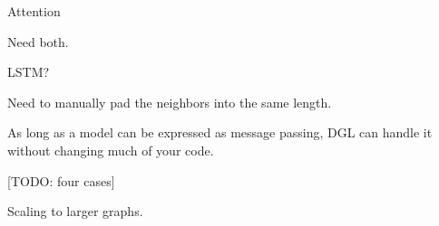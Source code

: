 \documentclass[11pt,aspectratio=169]{beamer}
\begin{document}
	\begin{frame}
		Attention
		
		Need both.
	\end{frame}

	\begin{frame}
		LSTM?
		
		Need to manually pad the neighbors into the same length.
	\end{frame}

	\begin{frame}
		As long as a model can be expressed as message passing, DGL can handle it
		without changing much of your code.
		
		[TODO: four cases]
	\end{frame}

	\begin{frame}
		Scaling to larger graphs.
	\end{frame}
\end{document}
